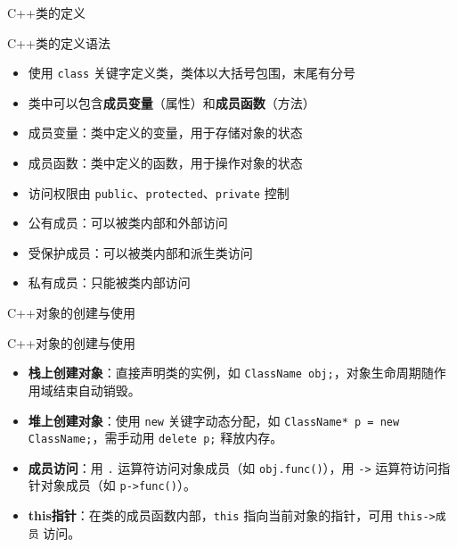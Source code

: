 \documentclass[UTF8,aspectratio=169]{beamer}
\begin{document}
\begin{frame}{C++类的定义}
    \begin{ytublock}{C++类的定义语法}
        \begin{itemize}
            \item 使用 \texttt{class} 关键字定义类，类体以大括号包围，末尾有分号
            \item 类中可以包含\textbf{成员变量}（属性）和\textbf{成员函数}（方法）
            \item 成员变量：类中定义的变量，用于存储对象的状态
            \item 成员函数：类中定义的函数，用于操作对象的状态
            \item 访问权限由 \texttt{public}、\texttt{protected}、\texttt{private} 控制
            \item 公有成员：可以被类内部和外部访问
            \item 受保护成员：可以被类内部和派生类访问
            \item 私有成员：只能被类内部访问
        \end{itemize}
    \end{ytublock}
\end{frame}

\begin{frame}{C++对象的创建与使用}
    \begin{ytublock}{C++对象的创建与使用}
        \begin{itemize}
            \item \textbf{栈上创建对象}：直接声明类的实例，如 \texttt{ClassName obj;}，对象生命周期随作用域结束自动销毁。
            \item \textbf{堆上创建对象}：使用 \texttt{new} 关键字动态分配，如 \texttt{ClassName* p = new ClassName;}，需手动用 \texttt{delete p;} 释放内存。
            \item \textbf{成员访问}：用 \texttt{.} 运算符访问对象成员（如 \texttt{obj.func()}），用 \texttt{->} 运算符访问指针对象成员（如 \texttt{p->func()}）。
            \item \textbf{this指针}：在类的成员函数内部，\texttt{this} 指向当前对象的指针，可用 \texttt{this->成员} 访问。
        \end{itemize}
    \end{ytublock}
\end{frame}
\end{document}
